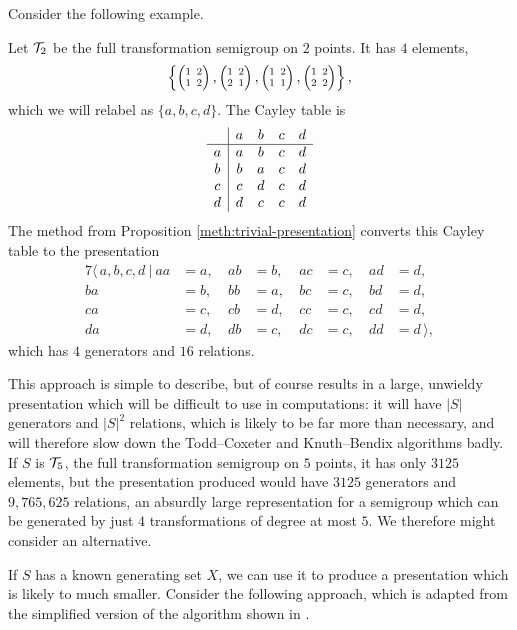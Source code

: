 Consider the following example.

\begin{example}
  Let $\mathcal{T}_2$ be the full transformation semigroup on $2$ points.  It has $4$
  elements,
  $$\left\{\transII 12, \transII 21, \transII 11, \transII 22\right\},$$
  which we will relabel as $\{a,b,c,d\}$.  The Cayley table is
  $$
  \begin{array}{c | c c c c}
    & a & b & c & d \\
    \hline
    a & a & b & c & d \\
    b & b & a & c & d \\
    c & c & d & c & d \\
    d & d & c & c & d \\
  \end{array}
  $$
  The method from Proposition \ref{meth:trivial-presentation} converts this
  Cayley table to the presentation
  \begin{alignat*}{7}
    \langle\, a,b,c,d ~|~
    aa&=a,\ & ab&=b,\ & ac&=c,\ & ad&=d, \\
    ba&=b,\ & bb&=a,\ & bc&=c,\ & bd&=d, \\
    ca&=c,\ & cb&=d,\ & cc&=c,\ & cd&=d, \\
    da&=d,\ & db&=c,\ & dc&=c,\ & dd&=d\,\rangle,
  \end{alignat*}
  which has $4$ generators and $16$ relations.
\end{example}

This approach is simple to describe, but of course results in a large, unwieldy
presentation which will be difficult to use in computations: it will have $|S|$
generators and $|S|^2$ relations, which is likely to be far more than necessary,
and will therefore slow down the Todd--Coxeter and Knuth--Bendix algorithms badly.
If $S$ is $\mathcal{T}_5$, the full transformation semigroup on $5$ points, it has only
$3125$ elements, but the presentation produced would have $3125$ generators and
$9,765,625$ relations, an absurdly large representation for a semigroup which
can be generated by just $4$ transformations of degree at most $5$.  We
therefore might consider an alternative.

If $S$ has a known generating set $X$, we can use it to produce a presentation
which is likely to much smaller.  Consider the following approach, which is
adapted from the simplified version of the algorithm shown in
\cite[\S 3.1]{froidure_pin}.

